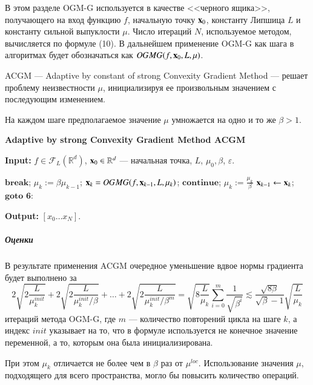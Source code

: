\documentclass{crm-article}
\begin{document}
В этом разделе OGM-G используется в качестве <<черного ящика>>, получающего на вход функцию $f$, начальную точку ${\bf x}_0$, константу Липшица $L$ и константу сильной выпуклости $\mu$. Число итераций $N$, используемое методом, вычисляется по формуле (10). В дальнейшем применение OGM-G как шага в алгоритмах будет обозначаться как $OGMG(f, {\bf x}_0, L, \mu)$.

ACGM --- Adaptive by constant of strong Convexity Gradient Method --- решает проблему неизвестности $\mu$, инициализируя ее произвольным значением с последующим изменением.

На каждом шаге предполагаемое значение $\mu$ умножается на одно и то же $\beta>1$.

\begin{algorithm}
\caption{\bf{Adaptive by strong Convexity Gradient Method ACGM}}
\label{ACGM}
\hspace*{\algorithmicindent} \textbf{Input: } $f\in \mathcal{F}_L(\mathbb{R}^d)$, ${\bf x}_0\in\mathbb{R}^d$ --- начальная точка, $L$, $\mu_0, \beta$, $\varepsilon$.
\begin{algorithmic}[1]
\STATE $\textbf{break}$;
\ENDIF
\STATE $\mu_k:=\beta\mu_{k-1}$;
\STATE ${\bf x}_k = OGMG(f, {\bf x}_{k-1}, L, \mu_k)$;
\STATE $\textbf{continue}$;
\ENDIF
\STATE $\mu_k:=\frac{\mu_k}{\beta}$
\STATE ${\bf x}_{k-1}\leftarrow{\bf x}_k$;
\ENDIF
\STATE $\textbf{goto 6}$:
\ENDFOR
\end{algorithmic}
\hspace*{\algorithmicindent} \textbf{Output: } $[x_0\ldots x_N]$.
\end{algorithm}

\subparagraph{Оценки}

В результате применения ACGM очередное уменьшение вдвое нормы градиента будет выполнено за
$$2\sqrt{2\frac{L}{\mu_k^{init}}}+2\sqrt{2\frac{L}{\mu_k^{init}/\beta}}+\ldots+2\sqrt{2\frac{L}{\mu_k^{init}/\beta^m}} = \sqrt{8\frac{L}{\mu_k}}\sum\limits_{i=0}^m\frac{1}{\sqrt{\beta^i}} \lesssim \frac{\sqrt{8\beta}}{\sqrt{\beta}-1}\sqrt{\frac{L}{\mu_k}}$$
итераций метода OGM-G, где $m$ --- количество повторений цикла на шаге $k$, а индекс $init$ указывает на то, что в формуле используется не конечное значение переменной, а то, которым она была инициализирована.

При этом $\mu_k$ отличается не более чем в $\beta$ раз от $\mu^{loc}$. Использование значения $\mu$, подходящего для всего пространства, могло бы повысить количество операций.
\end{document}
